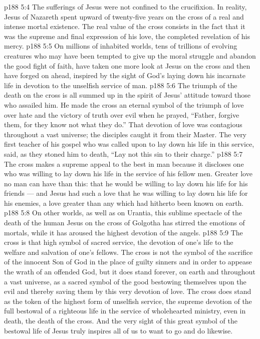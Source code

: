 \vs p188 5:4 \pc The sufferings of Jesus were not confined to the crucifixion. In reality, Jesus of Nazareth spent upward of twenty\hyp{}five years on the cross of a real and intense mortal existence. The real value of the cross consists in the fact that it was the supreme and final expression of his love, the completed revelation of his mercy.
\vs p188 5:5 \pc On millions of inhabited worlds, tens of trillions of evolving creatures who may have been tempted to give up the moral struggle and abandon the good fight of faith, have taken one more look at Jesus on the cross and then have forged on ahead, inspired by the sight of God’s laying down his incarnate life in devotion to the unselfish service of man.
\vs p188 5:6 The triumph of the death on the cross is all summed up in the spirit of Jesus’ attitude toward those who assailed him. He made the cross an eternal symbol of the triumph of love over hate and the victory of truth over evil when he prayed, \textcolor{ubdarkred}{“Father, forgive them, for they know not what they do.”} That devotion of love was contagious throughout a vast universe; the disciples caught it from their Master. The very first teacher of his gospel who was called upon to lay down his life in this service, said, as they stoned him to death, “Lay not this sin to their charge.”
\vs p188 5:7 The cross makes a supreme appeal to the best in man because it discloses one who was willing to lay down his life in the service of his fellow men. Greater love no man can have than this: that he would be willing to lay down his life for his friends --- and Jesus had such a love that he was willing to lay down his life for his enemies, a love greater than any which had hitherto been known on earth.
\vs p188 5:8 On other worlds, as well as on Urantia, this sublime spectacle of the death of the human Jesus on the cross of Golgotha has stirred the emotions of mortals, while it has aroused the highest devotion of the angels.
\vs p188 5:9 \pc The cross is that high symbol of sacred service, the devotion of one’s life to the welfare and salvation of one’s fellows. The cross is not the symbol of the sacrifice of the innocent Son of God in the place of guilty sinners and in order to appease the wrath of an offended God, but it does stand forever, on earth and throughout a vast universe, as a sacred symbol of the good bestowing themselves upon the evil and thereby saving them by this very devotion of love. The cross does stand as the token of the highest form of unselfish service, the supreme devotion of the full bestowal of a righteous life in the service of wholehearted ministry, even in death, the death of the cross. And the very sight of this great symbol of the bestowal life of Jesus truly inspires all of us to want to go and do likewise.
